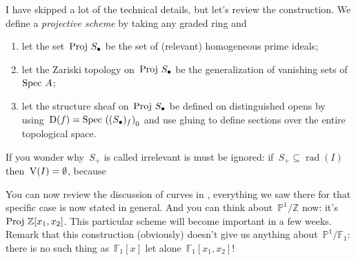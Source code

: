 I have skipped a lot of the technical details, but let's review the construction. We define a \emph{projective scheme} by taking any graded ring and
\begin{enumerate}
  \item let the set~$\operatorname{Proj\,} S_\bullet$ be the set of (relevant) homogeneous prime ideals;
  \item let the Zariski topology on~$\operatorname{Proj\,} S_\bullet$ be the generalization of vanishing sets of~$\operatorname{Spec\,} A$;
  \item let the structure sheaf on~$\operatorname{Proj\,} S_\bullet$ be defined on distinguished opens by using~$\operatorname{D}(f)=\operatorname{Spec\,}\left( (S_\bullet)_f \right)_0$ and use gluing to define sections over the entire topological space.
\end{enumerate}

\begin{remark}
  If you wonder why~$S_+$ is called irrelevant is must be ignored: if~$S_+\subseteq\operatorname{rad}(I)$ then~$\operatorname{V}(I)=\emptyset$, because
\end{remark}

You can now review the discussion of curves in , everything we saw there for that specific case is now stated in general. And you can think about~$\mathbb{P}^1/\mathbb{Z}$ now: it's~$\operatorname{Proj\,}\mathbb{Z}[x_1,x_2]$. This particular scheme will become important in a few weeks. Remark that this construction (obviously) doesn't give us anything about~$\mathbb{P}^1/\mathbb{F}_1$: there is no such thing as~$\mathbb{F}_1[x]$ let alone~$\mathbb{F}_1[x_1,x_2]$!
